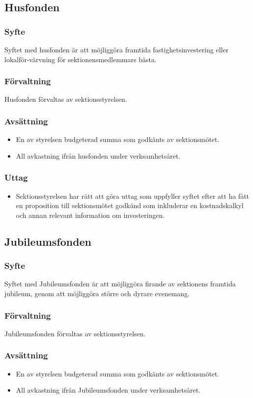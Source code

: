 \documentclass[a4paper, 10pt]{article}
\begin{document}
\subsection{Husfonden}
\subsubsection{Syfte}
\label{sec:husfond_syfte}
Syftet med husfonden är att möjliggöra framtida fastighetsinvestering eller lokalför-värvning för sektionensmedlemmars bästa.
\subsubsection{Förvaltning}
Husfonden förvaltas av sektionsstyrelsen.
\subsubsection{Avsättning}
\begin{itemize}
  \item En av styrelsen budgeterad summa som godkänts av sektionsmötet.
  \item All avkastning ifrån husfonden under verksamhetsåret.
\end{itemize}
\subsubsection{Uttag}
\begin{itemize}
  \item Sektionsstyrelsen har rätt att göra uttag som uppfyller syftet efter att ha fått en proposition till sektionsmötet godkänd som inkluderar en kostnadskalkyl och annan relevant information om investeringen.
\end{itemize}
\subsection{Jubileumsfonden}
\subsubsection{Syfte}
\label{sec:jubileumfond_syfte}
Syftet med Jubileumsfonden är att möjliggöra firande av sektionens framtida jubileum, genom att möjliggöra större och dyrare evenemang.
\subsubsection{Förvaltning}
Jubileumsfonden förvaltas av sektionsstyrelsen.
\subsubsection{Avsättning}
\begin{itemize}
  \item En av styrelsen budgeterad summa som godkänts av sektionsmötet.
  \item All avkastning ifrån Jubileumsfonden under verksamhetsåret.
\end{itemize}
\end{document}

